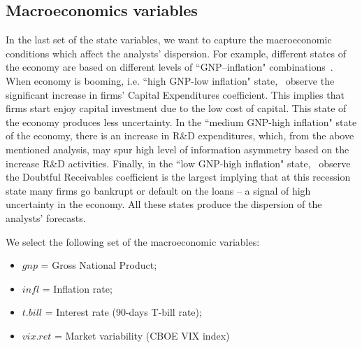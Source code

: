\subsection{Macroeconomics variables}
In the last set of the state variables, we want to capture the macroeconomic conditions which affect the analysts' dispersion. For example, different states of the economy are based on  different levels of ``GNP--inflation" combinations~\citep{lev1993,hope2005}. When economy is booming, i.e. ``high GNP-low inflation" state,~\cite{lev1993} observe the significant increase in firms' Capital Expenditures coefficient. This implies that firms start enjoy capital investment due to the low cost of capital. This state of the economy produces less uncertainty. In the ``medium GNP-high inflation" state of the economy, there is an increase in R\&D expenditures, which, from the above mentioned analysis, may spur high level of information asymmetry based on the increase R\&D activities. Finally, in the ``low GNP-high inflation" state,~\cite{lev1993} observe the Doubtful Receivables coefficient is the largest implying that at this recession state many firms go bankrupt or default on the loans -- a signal of high uncertainty in the economy. All these states produce the dispersion of the analysts' forecasts.

We select the following set of the macroeconomic variables:
\begin{itemize}
\item $gnp$ = Gross National Product;
\item $infl$ = Inflation rate;
\item $t.bill$ = Interest rate (90-days T-bill rate);
\item $vix.ret$ = Market variability (CBOE VIX index)
\end{itemize}
